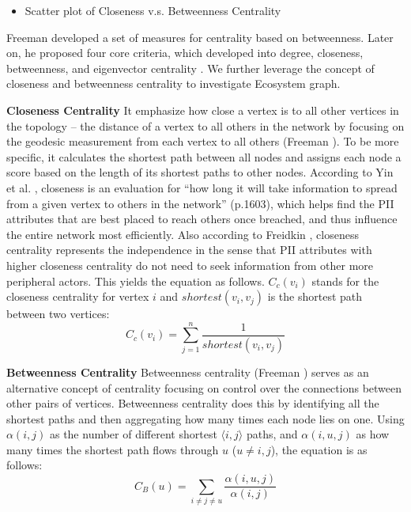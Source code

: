 \documentclass[conference]{IEEEtran}
\begin{document}
\begin{itemize}
\item Scatter plot of Closeness v.s. Betweenness Centrality
\end{itemize}

Freeman \cite{Freeman78centralityin} developed a set of measures for centrality based on betweenness. Later on, he proposed four core criteria, which developed into degree, closeness, betweenness, and eigenvector centrality  \cite{Freeman79centralityin}. We further leverage the concept of closeness and betweenness centrality to investigate Ecosystem graph.

\textbf{Closeness Centrality}
 It emphasize how close a vertex is to all other vertices in the topology -- the distance of a vertex to all others in the network by focusing on the geodesic measurement from each vertex to all others (Freeman \cite{Freeman79centralityin}). To be more specific, it calculates the shortest path between all nodes and assigns each node a score based on the length of its shortest paths to other nodes. According to Yin et al. \cite{Yin2006}, closeness is an evaluation for ``how long it will take information to spread from a given vertex to others in the network'' (p.1603), which helps find the PII attributes that are best placed to reach others once breached, and thus influence the entire network most efficiently. Also according to Freidkin \cite{Freidkin}, closeness centrality represents the independence in the sense that PII attributes with higher closeness centrality do not need to seek information from other more peripheral actors.
This yields the equation as follows. $C_{c}(v_{i})$ stands for the closeness centrality for vertex $i$ and $shortest(v_{i},v_{j})$ is the shortest path between two vertices:
\begin{equation}
C_{c}(v_{i}) = \sum_{j = 1}^{n} \frac{1}{shortest(v_{i}, v_{j})}
\label{closeness_centrality_equation}
\end{equation}

\textbf{Betweenness Centrality}
Betweenness centrality (Freeman \cite{Freeman79centralityin}) serves as an alternative concept of centrality focusing on control over the connections between other pairs of vertices. Betweenness centrality does this by identifying all the shortest paths and then aggregating how many times each node lies on one. Using $\alpha (i, j)$ as the number of different shortest $\langle i, j \rangle$ paths, and  $\alpha (i, u, j)$ as how many times the shortest path flows through $u$ ($ u \neq i, j$), the equation is as follows:
\begin{equation}
C_{B}(u) = \sum_{i \neq j \neq u}^{} \frac{\alpha (i, u, j) }{\alpha (i, j)}
\label{betweenness_centrality}
\end{equation}
\end{document}
